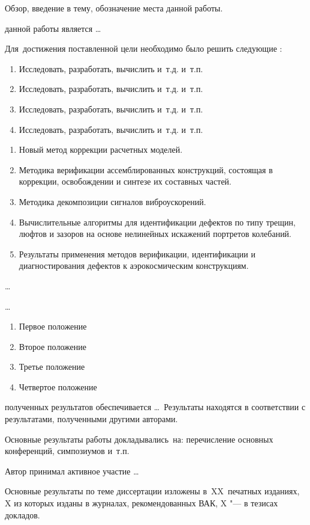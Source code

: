 
{\actuality} Обзор, введение в тему, обозначение места данной работы.

{\aim} данной работы является \ldots

Для~достижения поставленной цели необходимо было решить следующие {\tasks}:
\begin{enumerate}[beginpenalty = 10000] 
	\item Исследовать, разработать, вычислить и~т.\:д. и~т.\:п.
	\item Исследовать, разработать, вычислить и~т.\:д. и~т.\:п.
	\item Исследовать, разработать, вычислить и~т.\:д. и~т.\:п.
	\item Исследовать, разработать, вычислить и~т.\:д. и~т.\:п.
\end{enumerate}


{\novelty}
\begin{enumerate}[beginpenalty = 10000] 
	\item Новый метод коррекции расчетных моделей.
	\item Методика верификации ассемблированных конструкций, состоящая в коррекции, освобождении и синтезе их составных частей.
	\item Методика декомпозиции сигналов виброускорений.
	\item Вычислительные алгоритмы для идентификации дефектов по типу трещин, люфтов и зазоров на основе нелинейных искажений портретов колебаний.
	\item Результаты применения методов верификации, идентификации и диагностирования дефектов к аэрокосмическим конструкциям.
\end{enumerate}

{\influence} \ldots

{\methods} \ldots

{}
\begin{enumerate}[beginpenalty = 10000] 
	\item Первое положение
	\item Второе положение
	\item Третье положение
	\item Четвертое положение
\end{enumerate}

{\reliability} полученных результатов обеспечивается \ldots \ Результаты находятся в соответствии с результатами, полученными другими авторами.


{\probation}
Основные результаты работы докладывались~на:
перечисление основных конференций, симпозиумов и~т.\:п.

{\contribution} Автор принимал активное участие \ldots

{\publications} Основные результаты по теме диссертации изложены
в~XX~печатных изданиях,
X из которых изданы в журналах, рекомендованных ВАК,
X "--- в тезисах докладов.
